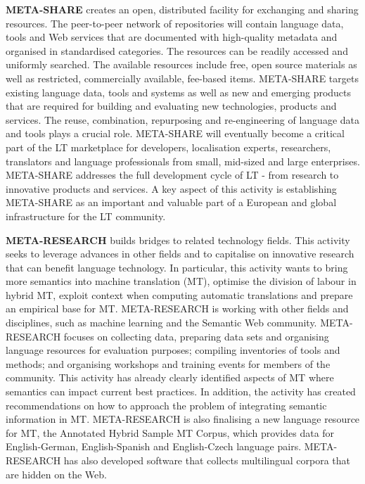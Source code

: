 \documentclass[]{../metanetpaper}
\begin{document}
\begin{multicols}{2}
\textbf{META-SHARE} creates an open, distributed facility for exchanging and sharing resources. The peer-to-peer network of repositories will contain language data, tools and Web services that are documented with high-quality metadata and organised in standardised categories. The resources can be readily accessed and uniformly searched. The available resources include free, open source materials as well as restricted, commercially available, fee-based items. META-SHARE targets existing language data, tools and systems as well as new and emerging products that are required for building and evaluating new technologies, products and services. The reuse, combination, repurposing and re-engineering of language data and tools plays a crucial role. META-SHARE will eventually become a critical part of the LT marketplace for developers, localisation experts, researchers, translators and language professionals from small, mid-sized and large enterprises. META-SHARE addresses the full development cycle of LT - from research to innovative products and services. A key aspect of this activity is establishing META-SHARE as an important and valuable part of a European and global infrastructure for the LT community. 

\textbf{META-RESEARCH} builds bridges to related technology fields. This activity seeks to leverage advances in other fields and to capitalise on innovative research that can benefit language technology. In particular, this activity wants to bring more semantics into machine translation (MT), optimise the division of labour in hybrid MT, exploit context when computing automatic translations and prepare an empirical base for MT. META-RESEARCH is working with other fields and disciplines, such as machine learning and the Semantic Web community. META-RESEARCH focuses on collecting data, preparing data sets and organising language resources for evaluation purposes; compiling inventories of tools and methods; and organising workshops and training events for members of the community. This activity has already clearly identified aspects of MT where semantics can impact current best practices. In addition, the activity has created recommendations on how to approach the problem of integrating semantic information in MT. META-RESEARCH is also finalising a new language resource for MT, the Annotated Hybrid Sample MT Corpus, which provides data for English-German, English-Spanish and English-Czech language pairs. META-RESEARCH has also developed software that collects multilingual corpora that are hidden on the Web.
\end{multicols}
\end{document}
